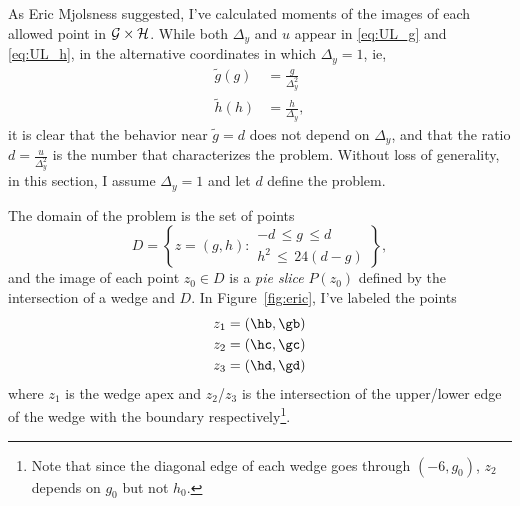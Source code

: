 \documentclass[twocolumn]{article}
\begin{document}
As Eric Mjolsness suggested, I've calculated moments of the images of
each allowed point in ${\cal G} \times {\cal H}$.  While both
$\Delta_y$ and $u$ appear in \eqref{eq:UL_g} and \eqref{eq:UL_h}, in
the alternative coordinates in which $\Delta_y=1$, ie,
\begin{align*}
  \tilde g(g) &= \frac{g}{\Delta_y^2} \\
  \tilde h(h) &= \frac{h}{\Delta_y},
\end{align*}
it is clear that the behavior near $\tilde g=d$ does not depend on
$\Delta_y$, and that the ratio $d = \frac{u}{\Delta_y^2}$ is the
number that characterizes the problem.  Without loss of generality, in
this section, I assume $\Delta_y=1$ and let $d$ define the problem.

The domain of the problem is the set of points
\begin{equation*}
  D = \left\{ z = (g,h) :
    \begin{array}{l}
      -d \, \leq g \, \leq d \\
      h^2\, \leq \, 24(d-g)
    \end{array}
    \right\},
\end{equation*}
and the image of each point $z_0 \in D$ is a \emph{pie slice} $P(z_0)$
defined by the intersection of a wedge and $D$.  In
Figure~\ref{fig:eric}, I've labeled the points
\begin{align*}
  z_1 &= \left( \hb, \gb \right) \\
  z_2 &= \left( \hc, \gc \right) \\
  z_3 &= \left( \hd, \gd \right)
\end{align*}
where $z_1$ is the wedge apex and $z_2$/$z_3$ is the intersection of
the upper/lower edge of the wedge with the boundary
respectively\footnote{Note that since the diagonal edge of each wedge
  goes through $(-6,g_0)$, $z_2$ depends on $g_0$ but not $h_0$.}.
\end{document}
